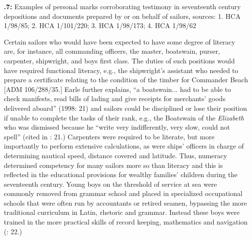\textbf{.7:} Examples of personal marks corroborating testimony in seventeenth century depositions and documents prepared by or on behalf of sailors, sources: 1. HCA 1/98/85; 2. HCA 1/101/220; 3. HCA 1/98/173; 4. HCA 1/98/62

Certain sailors who would have been expected to have some degree of literacy are, for instance, all commanding officers, the master, boatswain, purser, carpenter, shipwright, and boys first class. The duties of such positions would have required functional literacy, e.g., the shipwright’s assistant who needed to prepare a certificate relating to the condition of the timber for Commander Beach [ADM 106/288/35.] Earle further explains, “a boatswain... had to be able to check manifests, read bills of lading and give receipts for merchants’ goods delivered aboard” (1998: 21) and sailors could be disciplined or lose their position if unable to complete the tasks of their rank, e.g., the Boatswain of the \textit{Elizabeth} who was dismissed because he “write very indifferently, very slow, could not spell” (cited in \citealt{Earle1998}: 21.) Carpenters were required to be literate, but more importantly to perform extensive calculations, as were ships’ officers in charge of determining nautical speed, distance covered and latitude. Thus, numeracy determined competency for many sailors more so than literacy and this is reflected in the educational provisions for wealthy families’ children during the seventeenth century. Young boys on the threshold of service at sea were commonly removed from grammar school and placed in specialized occupational schools that were often run by accountants or retired seamen, bypassing the more traditional curriculum in Latin, rhetoric and grammar.  Instead these boys were trained in the more practical skills of record keeping, mathematics and navigation (\citealt{Earle1998}: 22.) 

